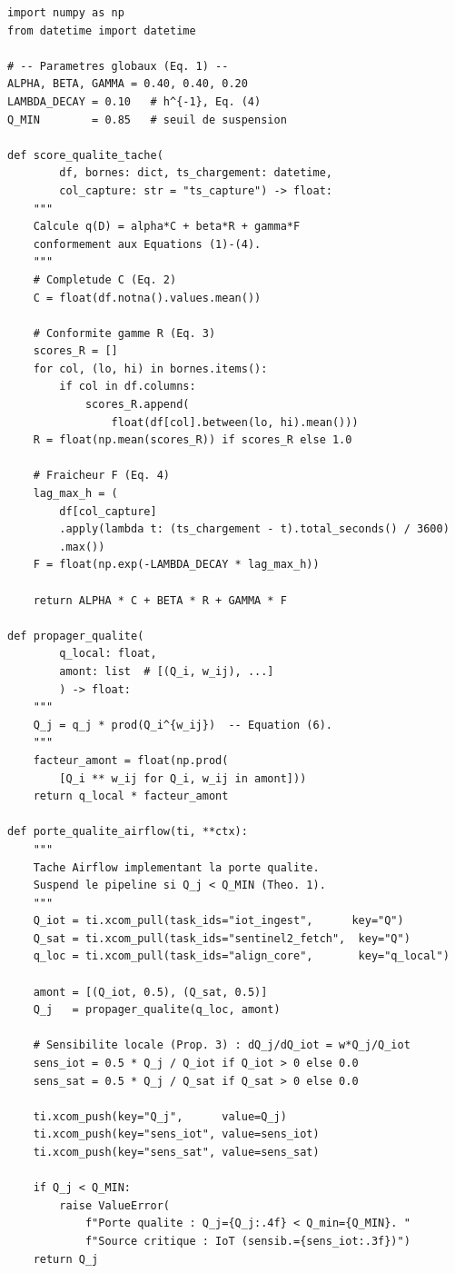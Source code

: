 \documentclass[12pt,a4paper]{article}
\theoremstyle{plain}
\theoremstyle{definition}
\theoremstyle{remark}
\begin{document}
\begin{lstlisting}[caption={Porte qualite : calcul et propagation de $Q_j$},
                   label={lst:qgate}]
import numpy as np
from datetime import datetime

# -- Parametres globaux (Eq. 1) --
ALPHA, BETA, GAMMA = 0.40, 0.40, 0.20
LAMBDA_DECAY = 0.10   # h^{-1}, Eq. (4)
Q_MIN        = 0.85   # seuil de suspension

def score_qualite_tache(
        df, bornes: dict, ts_chargement: datetime,
        col_capture: str = "ts_capture") -> float:
    """
    Calcule q(D) = alpha*C + beta*R + gamma*F
    conformement aux Equations (1)-(4).
    """
    # Completude C (Eq. 2)
    C = float(df.notna().values.mean())

    # Conformite gamme R (Eq. 3)
    scores_R = []
    for col, (lo, hi) in bornes.items():
        if col in df.columns:
            scores_R.append(
                float(df[col].between(lo, hi).mean()))
    R = float(np.mean(scores_R)) if scores_R else 1.0

    # Fraicheur F (Eq. 4)
    lag_max_h = (
        df[col_capture]
        .apply(lambda t: (ts_chargement - t).total_seconds() / 3600)
        .max())
    F = float(np.exp(-LAMBDA_DECAY * lag_max_h))

    return ALPHA * C + BETA * R + GAMMA * F

def propager_qualite(
        q_local: float,
        amont: list  # [(Q_i, w_ij), ...]
        ) -> float:
    """
    Q_j = q_j * prod(Q_i^{w_ij})  -- Equation (6).
    """
    facteur_amont = float(np.prod(
        [Q_i ** w_ij for Q_i, w_ij in amont]))
    return q_local * facteur_amont

def porte_qualite_airflow(ti, **ctx):
    """
    Tache Airflow implementant la porte qualite.
    Suspend le pipeline si Q_j < Q_MIN (Theo. 1).
    """
    Q_iot = ti.xcom_pull(task_ids="iot_ingest",      key="Q")
    Q_sat = ti.xcom_pull(task_ids="sentinel2_fetch",  key="Q")
    q_loc = ti.xcom_pull(task_ids="align_core",       key="q_local")

    amont = [(Q_iot, 0.5), (Q_sat, 0.5)]
    Q_j   = propager_qualite(q_loc, amont)

    # Sensibilite locale (Prop. 3) : dQ_j/dQ_iot = w*Q_j/Q_iot
    sens_iot = 0.5 * Q_j / Q_iot if Q_iot > 0 else 0.0
    sens_sat = 0.5 * Q_j / Q_sat if Q_sat > 0 else 0.0

    ti.xcom_push(key="Q_j",      value=Q_j)
    ti.xcom_push(key="sens_iot", value=sens_iot)
    ti.xcom_push(key="sens_sat", value=sens_sat)

    if Q_j < Q_MIN:
        raise ValueError(
            f"Porte qualite : Q_j={Q_j:.4f} < Q_min={Q_MIN}. "
            f"Source critique : IoT (sensib.={sens_iot:.3f})")
    return Q_j
\end{lstlisting}
\end{document}
